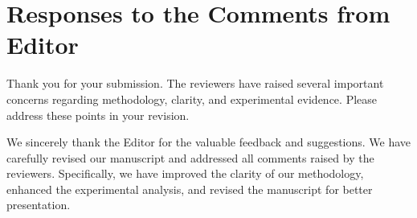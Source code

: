 \section*{Responses to the Comments from Editor}

\setcounter{commentcounter}{0} %

\begin{generalcomment}
Thank you for your submission. The reviewers have raised several important concerns regarding methodology, clarity, and experimental evidence. Please address these points in your revision.
\end{generalcomment}

\begin{generalresponse}
We sincerely thank the Editor for the valuable feedback and suggestions. We have carefully revised our manuscript and addressed all comments raised by the reviewers. Specifically, we have improved the clarity of our methodology, enhanced the experimental analysis, and revised the manuscript for better presentation.
\end{generalresponse}
